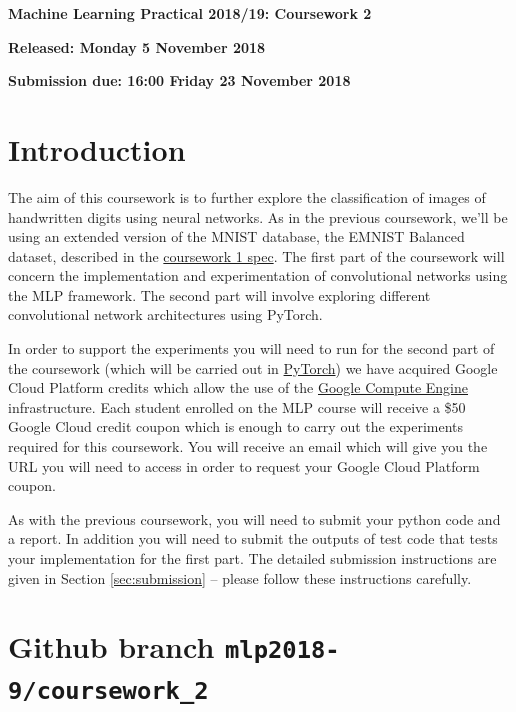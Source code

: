 \documentclass[11pt,]{article}
\begin{document}
\begin{center}
\textsf{\textbf{\Large Machine Learning Practical 2018/19: Coursework 2}}

\bigskip
\textbf{Released: Monday 5 November 2018}

\textbf{Submission due: 16:00 Friday 23 November 2018}
\end{center}
\section{Introduction}
\label{sec:introduction}



The aim of this coursework is to further explore the classification of images of handwritten digits using neural networks.  As in the previous coursework, we'll be using an extended version of the MNIST database, the EMNIST Balanced dataset, described in the \href{http://www.inf.ed.ac.uk/teaching/courses/mlp/2018-19/mlp_cw1_2018-19.pdf}{coursework 1 spec}. The first part of the coursework will concern the implementation and experimentation of convolutional networks using the MLP framework. The second part will involve exploring different convolutional network architectures using PyTorch.  


In order to support the experiments you will need to run for the second part of the coursework (which will be carried out in \href{https://pytorch.org}{PyTorch}) we have acquired Google Cloud Platform credits which  allow the use of the  
\href{https://cloud.google.com/compute/docs/}{Google Compute Engine} infrastructure.  Each student enrolled on the MLP course will receive a \$50 Google Cloud credit coupon which is enough to carry out the experiments required for this coursework.  You will receive an email which will give you the URL you will need to access in order to request your Google Cloud Platform coupon. 

As with the previous coursework, you will need to submit your python code and a report.  In addition you will need to submit the outputs of test code that tests your implementation for the first part.   The detailed submission instructions are given in Section \ref{sec:submission} -- please follow these instructions carefully.

\section{Github branch \texttt{mlp2018-9/coursework\_2}}
\label{sec:code}
\end{document}
